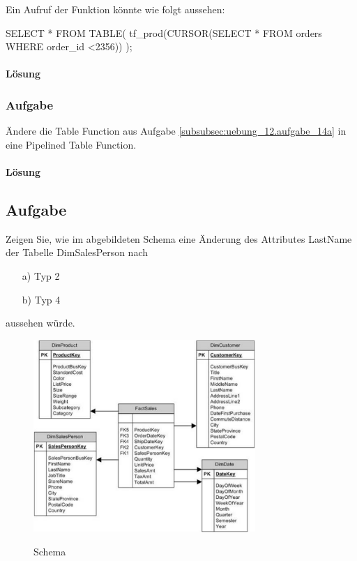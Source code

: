 Ein Aufruf der Funktion könnte wie folgt aussehen:
\begin{sqlcode}
SELECT * 
FROM TABLE(
  tf_prod(CURSOR(SELECT * FROM orders WHERE order_id <2356))
);
\end{sqlcode}

\paragraph*{Lösung}
\label{subsubsec:uebung_12.aufgabe_14a.loesung}

\subsubsection{Aufgabe}
\label{subsec:uebung_12.aufgabe_14b}
Ändere die Table Function aus Aufgabe \ref{subsubsec:uebung_12.aufgabe_14a} in eine Pipelined Table Function.

\paragraph*{Lösung}
\label{subsubsec:uebung_12.aufgabe_14b.loesung}


\subsection{Aufgabe}
\label{subsec:uebung_12.aufgabe_15}
Zeigen Sie, wie im abgebildeten Schema eine Änderung des Attributes \glqq{}LastName\grqq{} der Tabelle \glqq{}DimSalesPerson\grqq{} nach 

\begin{itemize}[itemsep=0pt]
  \item[a)] Typ 2
  \item[b)] Typ 4
\end{itemize}

aussehen würde.


\begin{figure}[H]
  \centering
  \includegraphics[width=0.75\textwidth]{img//uebung_12_-_aufgabe_15.png}
  \label{img:uebung_12_-_aufgabe_15}
  \caption{Schema}
\end{figure}

